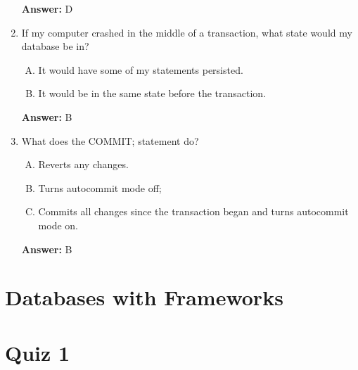 \documentclass[12pt]{article}
\begin{document}
\begin{enumerate}[1.]
    \textbf{Answer:} D

    \item

    If my computer crashed in the middle of a transaction, what state would my database be in?

    \bigskip

    \begin{enumerate}[A.]
        \item It would have some of my statements persisted.
        \item It would be in the same state before the transaction.
    \end{enumerate}

    \bigskip

    \textbf{Answer:} B

    \item

    What does the COMMIT; statement do?

    \bigskip

    \begin{enumerate}[A.]
        \item Reverts any changes.
        \item Turns autocommit mode off;
        \item Commits all changes since the transaction began and turns autocommit mode on.
    \end{enumerate}

    \bigskip

    \textbf{Answer:} B

\end{enumerate}

\bigskip

\section{Databases with Frameworks}

\bigskip

\section{Quiz 1}

\bigskip
\end{document}
